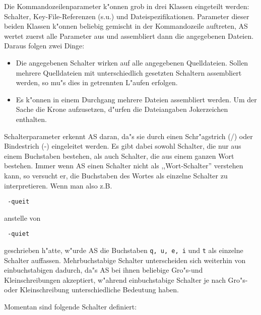 \documentclass[12pt,a4paper,twoside]{report}
\makeatletter
\newcommand{\tty}[1]{{\tt #1}}
\newcommand{\ttindex}[1]{\index{#1@{\tt #1}}}
\makeatother
\begin{document}
Die Kommandozeilenparameter k"onnen grob in drei Klassen eingeteilt
werden: Schalter, Key-File-Referenzen (s.u.) und Dateispezifikationen. 
Parameter dieser beiden Klassen k"onnen beliebig gemischt in der
Kommandozeile auftreten, AS wertet zuerst alle Parameter aus und
assembliert dann die angegebenen Dateien. Daraus folgen zwei Dinge:
\begin{itemize}
\item{Die angegebenen Schalter wirken auf alle angegebenen Quelldateien.
      Sollen mehrere Quelldateien mit unterschiedlich gesetzten Schaltern
      assembliert werden, so mu"s dies in getrennten L"aufen erfolgen.}
\item{Es k"onnen in einem Durchgang mehrere Dateien assembliert werden.
      Um der Sache die Krone aufzusetzen, d"urfen die Dateiangaben
      Jokerzeichen enthalten.}
\end{itemize}
Schalterparameter erkennt AS daran, da"s sie durch einen
Schr"agstrich (/) oder Bindestrich (-) eingeleitet werden.  Es gibt dabei
sowohl Schalter, die nur aus einem Buchstaben bestehen, als auch Schalter,
die aus einem ganzen Wort bestehen.  Immer wenn AS einen Schalter nicht
als ,,Wort-Schalter'' verstehen kann, so versucht er, die Buchstaben des
Wortes als einzelne Schalter zu interpretieren.  Wenn man also z.B.
\begin{verbatim}
 -queit
\end{verbatim}
anstelle von
\begin{verbatim}
 -quiet
\end{verbatim}
geschrieben h"atte, w"urde AS die Buchstaben \tty{q, u, e, i} und \tty{t}
als einzelne Schalter auffassen.  Mehrbuchstabige Schalter unterscheiden
sich weiterhin von einbuchstabigen dadurch, da"s AS bei ihnen beliebige
Gro"s-und Kleinschreibungen akzeptiert, w"ahrend einbuchstabige Schalter
je nach Gro"s- oder Kleinschreibung unterschiedliche Bedeutung haben.
\par
Momentan sind folgende Schalter definiert:
\ttindex{SHARED}
\end{document}
